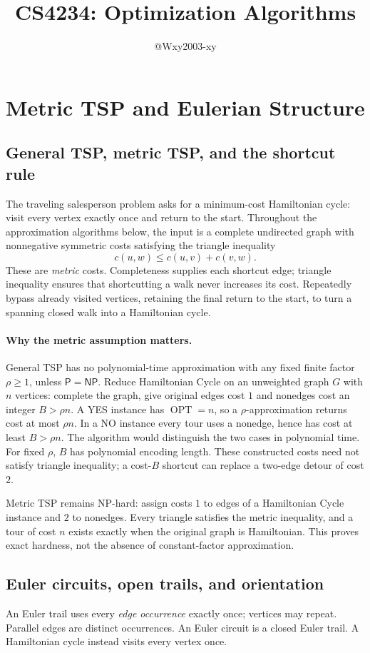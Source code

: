 \documentclass[10pt]{article}
\title{CS4234: Optimization Algorithms}
\author{@Wxy2003-xy}
\date{}
\theoremstyle{definition}
\newcommand{\OPT}{\operatorname{OPT}}
\newcommand{\NP}{\mathsf{NP}}
\newcommand{\PTIME}{\mathsf{P}}
\begin{document}
\section{Metric TSP and Eulerian Structure}\label{tsp:main}

\subsection{General TSP, metric TSP, and the shortcut rule}
The traveling salesperson problem asks for a minimum-cost Hamiltonian
cycle: visit every vertex exactly once and return to the start.  Throughout
the approximation algorithms below, the input is a complete undirected
graph with nonnegative symmetric costs satisfying the triangle inequality
\[
c(u,w)\le c(u,v)+c(v,w).
\]
These are \emph{metric} costs.  Completeness supplies each shortcut edge;
triangle inequality ensures that shortcutting a walk never increases its
cost.  Repeatedly bypass already visited vertices, retaining the final
return to the start, to turn a spanning closed walk into a Hamiltonian cycle.

\paragraph{Why the metric assumption matters.}
General TSP has no polynomial-time approximation with any fixed finite
factor $\rho\ge1$, unless $\PTIME=\NP$.  Reduce Hamiltonian Cycle on an
unweighted graph $G$ with $n$ vertices: complete the graph, give original
edges cost $1$ and nonedges cost an integer $B>\rho n$.  A YES instance has
$\OPT=n$, so a $\rho$-approximation returns cost at most $\rho n$.  In a NO
instance every tour uses a nonedge, hence has cost at least $B>\rho n$.
The algorithm would distinguish the two cases in polynomial time.  For
fixed $\rho$, $B$ has polynomial encoding length.  These constructed costs
need not satisfy triangle inequality; a cost-$B$ shortcut can replace a
two-edge detour of cost $2$.

Metric TSP remains NP-hard: assign costs $1$ to edges of a Hamiltonian Cycle
instance and $2$ to nonedges.  Every triangle satisfies the metric inequality,
and a tour of cost $n$ exists exactly when the original graph is Hamiltonian.
This proves exact hardness, not the absence of constant-factor approximation.

\subsection{Euler circuits, open trails, and orientation}\label{tsp:euler}
An Euler trail uses every \emph{edge occurrence} exactly once; vertices may
repeat.  Parallel edges are distinct occurrences.  An Euler circuit is a
closed Euler trail.  A Hamiltonian cycle instead visits every vertex once.
\end{document}

